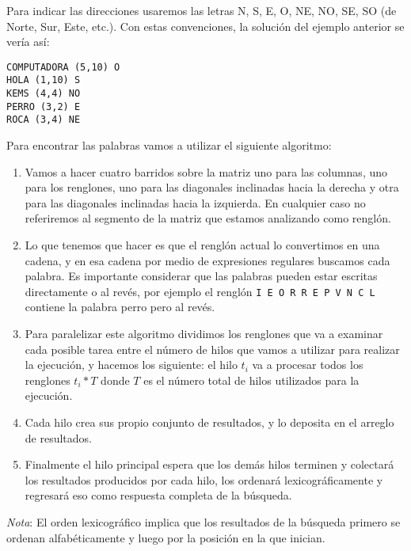 \documentclass[a4paper,11pt]{article}
\begin{document}
	Para indicar las direcciones usaremos las letras N, S, E, O, NE, NO, SE, SO (de Norte, Sur, Este, etc.). Con estas convenciones, la solución del ejemplo anterior se vería así:
	\begin{verbatim}
COMPUTADORA (5,10) O
HOLA (1,10) S
KEMS (4,4) NO
PERRO (3,2) E
ROCA (3,4) NE
	\end{verbatim}

	Para encontrar las palabras vamos a utilizar el siguiente algoritmo:

	\begin{enumerate}
		\item Vamos a hacer cuatro barridos sobre la matriz uno para las columnas, uno para los renglones, uno para las diagonales inclinadas hacia la derecha y otra para las diagonales inclinadas hacia la izquierda. En cualquier caso no referiremos al segmento de la matriz que estamos analizando como renglón.

		\item Lo que tenemos que hacer es que el renglón actual lo convertimos en una cadena, y en esa cadena por medio de expresiones regulares buscamos cada palabra. Es importante considerar que las palabras pueden estar escritas directamente o al revés, por ejemplo el renglón \verb|I E O R R E P V N C L| contiene la palabra perro pero al revés.

		\item Para paralelizar este algoritmo dividimos los renglones que va a examinar cada posible tarea entre el número de hilos que vamos a utilizar para realizar la ejecución, y hacemos los siguiente:
		el hilo $ t_i $ va a procesar todos los renglones $ t_i * T $ donde $ T $ es el número total de hilos utilizados para la ejecución.

		\item Cada hilo crea sus propio conjunto de resultados, y lo deposita en el arreglo de resultados.

		\item Finalmente el hilo principal espera que los demás hilos terminen y colectará los resultados producidos por cada hilo, los ordenará lexicográficamente y regresará eso como respuesta completa de la búsqueda.

	\end{enumerate}

	\emph{Nota}: El orden lexicográfico implica que los resultados de la búsqueda primero se ordenan alfabéticamente y luego por la posición en la que inician.\\
\end{document}

